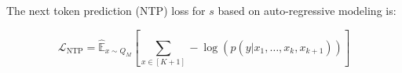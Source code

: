 The next token prediction (NTP) loss for $s$ based on auto-regressive modeling is:
\begin{small}
\begin{equation}
\mathcal{L}_\mathrm{NTP} = \hat{\mathbb{E}}_{{x} \sim Q_M} \left[ \sum_{{x} \in [K+1]} -\log \left( p(y | {x}_1, \dots, {x}_k, {x}_{k+1}) \right) \right]
\end{equation}
\end{small}

